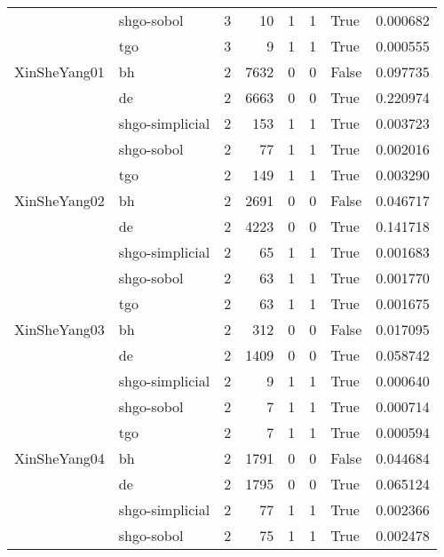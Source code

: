 \begin{longtable}{llrrrrlr}
         & shgo-sobol &     3 &       10 &      1 &       1 &    True &    0.000682 \\
         & tgo &     3 &        9 &      1 &       1 &    True &    0.000555 \\
XinSheYang01 & bh &     2 &     7632 &      0 &       0 &   False &    0.097735 \\
         & de &     2 &     6663 &      0 &       0 &    True &    0.220974 \\
         & shgo-simplicial &     2 &      153 &      1 &       1 &    True &    0.003723 \\
         & shgo-sobol &     2 &       77 &      1 &       1 &    True &    0.002016 \\
         & tgo &     2 &      149 &      1 &       1 &    True &    0.003290 \\
XinSheYang02 & bh &     2 &     2691 &      0 &       0 &   False &    0.046717 \\
         & de &     2 &     4223 &      0 &       0 &    True &    0.141718 \\
         & shgo-simplicial &     2 &       65 &      1 &       1 &    True &    0.001683 \\
         & shgo-sobol &     2 &       63 &      1 &       1 &    True &    0.001770 \\
         & tgo &     2 &       63 &      1 &       1 &    True &    0.001675 \\
XinSheYang03 & bh &     2 &      312 &      0 &       0 &   False &    0.017095 \\
         & de &     2 &     1409 &      0 &       0 &    True &    0.058742 \\
         & shgo-simplicial &     2 &        9 &      1 &       1 &    True &    0.000640 \\
         & shgo-sobol &     2 &        7 &      1 &       1 &    True &    0.000714 \\
         & tgo &     2 &        7 &      1 &       1 &    True &    0.000594 \\
XinSheYang04 & bh &     2 &     1791 &      0 &       0 &   False &    0.044684 \\
         & de &     2 &     1795 &      0 &       0 &    True &    0.065124 \\
         & shgo-simplicial &     2 &       77 &      1 &       1 &    True &    0.002366 \\
         & shgo-sobol &     2 &       75 &      1 &       1 &    True &    0.002478 \\

\end{longtable}
